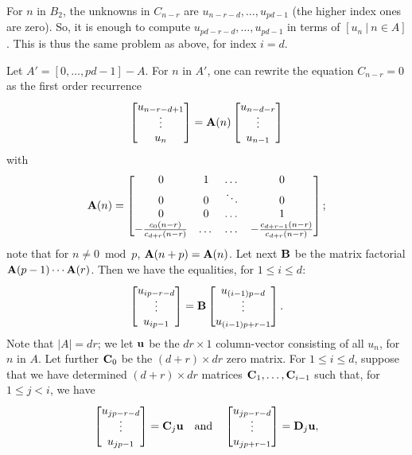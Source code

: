 \documentclass{sig-alternate}
\def\mA {\ensuremath{{\bf A}}}
\def\mmu {\ensuremath{{\bf u}}}
\def\mB {\ensuremath{{\bf B}}}
\def\mC {\ensuremath{{\bf C}}}
\def\mD {\ensuremath{{\bf D}}}
\begin{document}
For $n$ in $B_2$, the unknowns in $C_{n-r}$ are
$u_{n-r-d},\dots,u_{pd-1}$ (the higher index ones are zero). So, it is
enough to compute $u_{pd-r-d},\dots,u_{pd-1}$ in terms of $[u_n\ |\
n \in A]$. This is thus the same problem as above, for index $i=d$.

\smallskip{}  Let
$A'=[0,\dots,pd-1]-A$. For $n$ in $A'$, one can rewrite the equation
$C_{n-r}=0$ as the first order recurrence
\begin{equation}
  \label{eq:rec}
\left [ \begin{matrix}
u_{n-r-d+1}\\[-1mm]
\vdots \\
u_{n}
\end{matrix} \right ] = 
\mA(n) \left [ \begin{matrix}
u_{n-d-r}\\[-1mm]
\vdots \\
u_{n-1}
\end{matrix} \right ]  
\end{equation}
with
$$
\mA(n)=\left [ \begin{matrix}
0&1&\dots&0\\
0&0&\ddots&0\\
0&0&\dots&1\\
-\frac{c_{0}(n-r)}{c_{d+r}(n-r)} &\dots&\dots& -\frac{c_{d+r-1}(n-r)}{c_{d+r}(n-r)}
\end{matrix} \right ];$$ note that for $n\ne 0\bmod p$,
$\mA(n+p)=\mA(n)$. Let next $\mB$ be the matrix factorial
$\mA(p-1)\cdots\mA(r)$. Then we have the equalities, for $1 \le i \le d$:
$$
\left [ \begin{matrix}
u_{ip-r-d}\\[-1mm]
\vdots \\
u_{ip-1}
\end{matrix} \right ] = 
\mB \left [ \begin{matrix}
u_{(i-1)p-d}\\[-1mm]
\vdots \\
u_{(i-1)p+r-1}
\end{matrix} \right ].
$$
Note that $|A|=dr$; we let $\mmu$ be the $dr\times 1$
column-vector consisting of all $u_n$, for $n$ in $A$. Let further
$\mC_0$ be the $(d+r)\times dr$ zero matrix. For $1 \le i \le d$,
suppose that we have determined $(d+r)\times dr$ matrices 
$\mC_1,\dots,\mC_{i-1}$ such that, for $1 \le j < i$, we have
\begin{equation}
  \label{eq:Cj}
\left [ \begin{matrix}
u_{jp-r-d}\\[-1mm]
\vdots \\
u_{jp-1}
\end{matrix} \right ] = 
\mC_j \mmu
\quad\text{and}\quad
\left [ \begin{matrix}
u_{jp-r-d}\\[-1mm]
\vdots \\
u_{jp+r-1}
\end{matrix} \right ] = \mD_j \mmu,
\end{equation}
\end{document}
